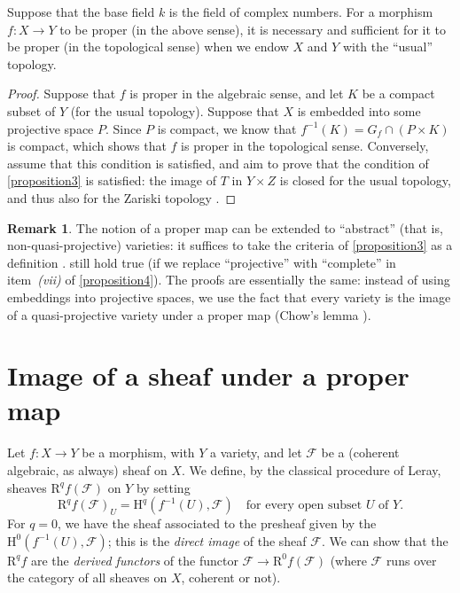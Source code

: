 \documentclass[10pt]{article}
\theoremstyle{plain}
\newenvironment{proposition}[1]
  {\renewcommand\theinnercustomproposition{#1}\innercustomproposition}
  {\endinnercustomproposition}
\theoremstyle{definition}
\newtheorem*{remark}{Remark}
\newcommand{\sh}{\mathscr}
\newcommand{\HH}{\mathrm{H}}
\newcommand{\RR}{\mathrm{R}}
\newcommand{\oldpage}[1]{\marginpar{\textit{p.~#1}}}
\begin{document}
\begin{proposition}{5}
\label{proposition5}
  Suppose that the base field $k$ is the field of complex numbers.
  For a morphism $f\colon X\to Y$ to be proper (in the above sense), it is necessary and sufficient for it to be proper (in the topological sense) when we endow $X$ and $Y$ with the ``usual'' topology.
\end{proposition}

\begin{proof}
  Suppose that $f$ is proper in the algebraic sense, and let $K$ be a compact subset of $Y$ (for the usual topology).
  Suppose that $X$ is embedded into some projective space $P$.
  Since $P$ is compact, we know that $f^{-1}(K)=G_f\cap(P\times K)$ is compact, which shows that $f$ is proper in the topological sense.
  Conversely, assume that this condition is satisfied, and aim to prove that the condition of \cref{proposition3} is satisfied:
\oldpage{102}
  the image of $T$ in $Y\times Z$ is closed for the usual topology, and thus also for the Zariski topology \cite[proposition~7, p.~12]{13}.
\end{proof}

\begin{remark}
  The notion of a proper map can be extended to ``abstract'' (that is, non-quasi-projective) varieties:
  it suffices to take the criteria of \cref{proposition3} as a definition \cite{4}.
   still hold true (if we replace ``projective'' with ``complete'' in item~\emph{(vii)} of \cref{proposition4}).
  The proofs are essentially the same:
  instead of using embeddings into projective spaces, we use the fact that every variety is the image of a quasi-projective variety under a proper map (Chow's lemma \cite{4,14}).
\end{remark}


\section{Image of a sheaf under a proper map}

Let $f\colon X\to Y$ be a morphism, with $Y$ a variety, and let $\sh{F}$ be a (coherent algebraic, as always) sheaf on $X$.
We define, by the classical procedure of Leray, sheaves $\RR^qf(\sh{F})$ on $Y$ by setting
\[
  \RR^qf(\sh{F})_U = \HH^q(f^{-1}(U),\sh{F})
  \quad\mbox{for every open subset $U$ of $Y$.}
\]
For $q=0$, we have the sheaf associated to the presheaf given by the $\HH^0(f^{-1}(U),\sh{F})$;
this is the \emph{direct image} of the sheaf $\sh{F}$.
We can show \cite{7} that the $\RR^qf$ are the \emph{derived functors} of the functor $\sh{F}\to\RR^0f(\sh{F})$ (where $\sh{F}$ runs over the category of all sheaves on $X$, coherent or not).
\end{document}
